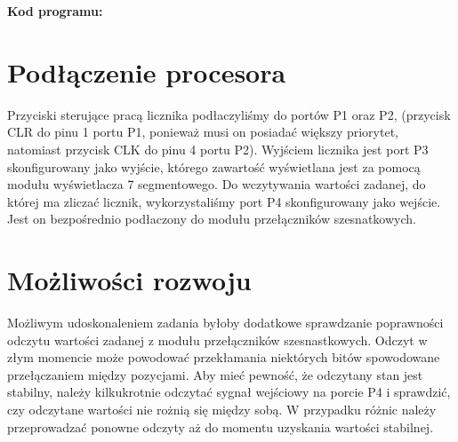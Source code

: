 \documentclass[fleqn]{article}
\begin{document}
\textbf{Kod programu:}







\section{Podłączenie procesora}

Przyciski sterujące pracą licznika podłaczyliśmy do portów P1 oraz P2, (przycisk CLR do pinu 1 portu P1, ponieważ musi on posiadać większy priorytet, natomiast przycisk CLK do pinu 4 portu P2). Wyjściem licznika jest port P3 skonfigurowany jako wyjście, którego zawartość wyświetlana jest za pomocą modułu wyświetlacza 7 segmentowego. Do wczytywania wartości zadanej, do której ma zliczać licznik, wykorzystaliśmy port P4 skonfigurowany jako wejście. Jest on bezpośrednio podłaczony do modułu przełączników szesnatkowych.

\section{Możliwości rozwoju}

Możliwym udoskonaleniem zadania byłoby dodatkowe sprawdzanie poprawności odczytu wartości zadanej z modułu przełączników szesnastkowych. Odczyt w złym momencie może powodować przekłamania niektórych bitów spowodowane przełączaniem między pozycjami. Aby mieć pewność, że odczytany stan jest stabilny, należy kilkukrotnie odczytać sygnał wejściowy na porcie P4 i sprawdzić, czy odczytane wartości nie rożnią się między sobą. W przypadku różnic należy przeprowadzać ponowne odczyty aż do momentu uzyskania wartości stabilnej.
\end{document}
